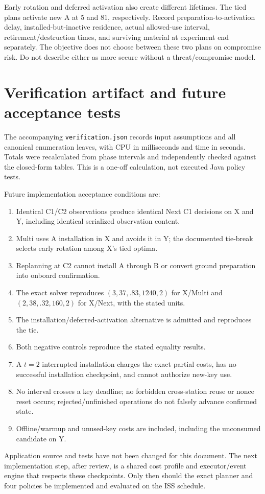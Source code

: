 \documentclass[11pt,a4paper]{article}
\newcommand{\act}[1]{\texttt{#1}}
\begin{document}
Early rotation and deferred activation also create different lifetimes. The tied plans activate new A at $5$ and $81$, respectively. Record preparation-to-activation delay, installed-but-inactive residence, actual allowed-use interval, retirement/destruction times, and surviving material at experiment end separately. The objective does not choose between these two plans on compromise risk. Do not describe either as more secure without a threat/compromise model.

\section{Verification artifact and future acceptance tests}
The accompanying \act{verification.json} records input assumptions and all canonical enumeration leaves, with CPU in milliseconds and time in seconds. Totals were recalculated from phase intervals and independently checked against the closed-form tables. This is a one-off calculation, not executed Java policy tests.

Future implementation acceptance conditions are:
\begin{enumerate}
\item Identical C1/C2 observations produce identical Next C1 decisions on X and Y, including identical serialized observation content.
\item Multi uses A installation in X and avoids it in Y; the documented tie-break selects early rotation among X's tied optima.
\item Replanning at C2 cannot install A through B or convert ground preparation into onboard confirmation.
\item The exact solver reproduces $(3,37,.83,1240,2)$ for X/Multi and $(2,38,.32,160,2)$ for X/Next, with the stated units.
\item The installation/deferred-activation alternative is admitted and reproduces the tie.
\item Both negative controls reproduce the stated equality results.
\item A $t=2$ interrupted installation charges the exact partial costs, has no successful installation checkpoint, and cannot authorize new-key use.
\item No interval crosses a key deadline; no forbidden cross-station reuse or nonce reset occurs; rejected/unfinished operations do not falsely advance confirmed state.
\item Offline/warmup and unused-key costs are included, including the unconsumed candidate on Y.
\end{enumerate}
Application source and tests have not been changed for this document. The next implementation step, after review, is a shared cost profile and executor/event engine that respects these checkpoints. Only then should the exact planner and four policies be implemented and evaluated on the ISS schedule.
\end{document}
